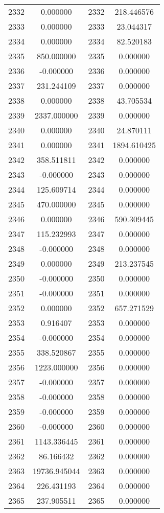 \documentclass[12pt]{article}
\begin{document}
\begin{longtable}{@{}cccc@{}}
2332 & 0.000000 & 2332 & 218.446576 \\
2333 & 0.000000 & 2333 & 23.044317 \\
2334 & 0.000000 & 2334 & 82.520183 \\
2335 & 850.000000 & 2335 & 0.000000 \\
2336 & -0.000000 & 2336 & 0.000000 \\
2337 & 231.244109 & 2337 & 0.000000 \\
2338 & 0.000000 & 2338 & 43.705534 \\
2339 & 2337.000000 & 2339 & 0.000000 \\
2340 & 0.000000 & 2340 & 24.870111 \\
2341 & 0.000000 & 2341 & 1894.610425 \\
2342 & 358.511811 & 2342 & 0.000000 \\
2343 & -0.000000 & 2343 & 0.000000 \\
2344 & 125.609714 & 2344 & 0.000000 \\
2345 & 470.000000 & 2345 & 0.000000 \\
2346 & 0.000000 & 2346 & 590.309445 \\
2347 & 115.232993 & 2347 & 0.000000 \\
2348 & -0.000000 & 2348 & 0.000000 \\
2349 & 0.000000 & 2349 & 213.237545 \\
2350 & -0.000000 & 2350 & 0.000000 \\
2351 & -0.000000 & 2351 & 0.000000 \\
2352 & 0.000000 & 2352 & 657.271529 \\
2353 & 0.916407 & 2353 & 0.000000 \\
2354 & -0.000000 & 2354 & 0.000000 \\
2355 & 338.520867 & 2355 & 0.000000 \\
2356 & 1223.000000 & 2356 & 0.000000 \\
2357 & -0.000000 & 2357 & 0.000000 \\
2358 & -0.000000 & 2358 & 0.000000 \\
2359 & -0.000000 & 2359 & 0.000000 \\
2360 & -0.000000 & 2360 & 0.000000 \\
2361 & 1143.336445 & 2361 & 0.000000 \\
2362 & 86.166432 & 2362 & 0.000000 \\
2363 & 19736.945044 & 2363 & 0.000000 \\
2364 & 226.431193 & 2364 & 0.000000 \\
2365 & 237.905511 & 2365 & 0.000000 \\

\end{longtable}
\end{document}

